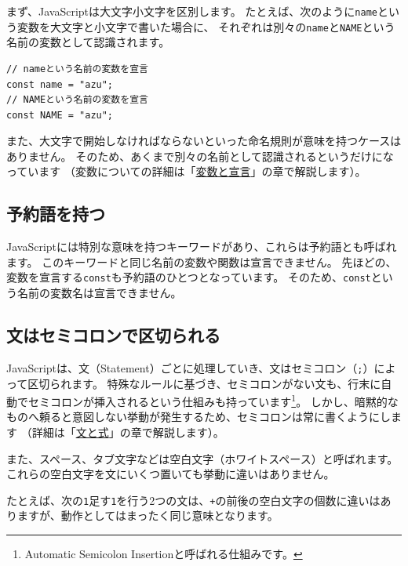 まず、JavaScriptは大文字小文字を区別します。
たとえば、次のように\texttt{name}という変数を大文字と小文字で書いた場合に、
それぞれは別々の\texttt{name}と\texttt{NAME}という名前の変数として認識されます。

\begin{lstlisting}
// nameという名前の変数を宣言
const name = "azu";
// NAMEという名前の変数を宣言
const NAME = "azu";
\end{lstlisting}

また、大文字で開始しなければならないといった命名規則が意味を持つケースはありません。
そのため、あくまで別々の名前として認識されるというだけになっています
（変数についての詳細は「\hyperlink{variable-and-declaration}{変数と宣言}」の章で解説します）。

\hypertarget{reserved-keyword}{%
\subsection{予約語を持つ}\label{reserved-keyword}}

JavaScriptには特別な意味を持つキーワードがあり、これらは予約語とも呼ばれます。
このキーワードと同じ名前の変数や関数は宣言できません。
先ほどの、変数を宣言する\texttt{const}も予約語のひとつとなっています。
そのため、\texttt{const}という名前の変数名は宣言できません。

\hypertarget{statement-semicolon}{%
\subsection{文はセミコロンで区切られる}\label{statement-semicolon}}

JavaScriptは、文（Statement）ごとに処理していき、文はセミコロン（\texttt{;}）によって区切られます。
特殊なルールに基づき、セミコロンがない文も、行末に自動でセミコロンが挿入されるという仕組みも持っています\footnote{Automatic Semicolon Insertionと呼ばれる仕組みです。}。
しかし、暗黙的なものへ頼ると意図しない挙動が発生するため、セミコロンは常に書くようにします
（詳細は「\hyperlink{statement-and-expression}{文と式}」の章で解説します）。

また、スペース、タブ文字などは空白文字（ホワイトスペース）と呼ばれます。
これらの空白文字を文にいくつ置いても挙動に違いはありません。

たとえば、次の\texttt{1}足す\texttt{1}を行う2つの文は、\texttt{+}の前後の空白文字の個数に違いはありますが、動作としてはまったく同じ意味となります。

